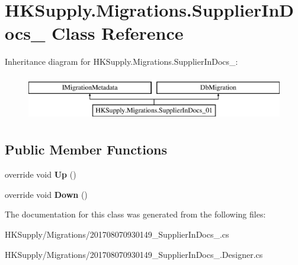 \hypertarget{class_h_k_supply_1_1_migrations_1_1_supplier_in_docs__01}{}\section{H\+K\+Supply.\+Migrations.\+Supplier\+In\+Docs\+\_ Class Reference}
\label{class_h_k_supply_1_1_migrations_1_1_supplier_in_docs__01}
Inheritance diagram for H\+K\+Supply.\+Migrations.\+Supplier\+In\+Docs\+\_\+:\begin{figure}[H]
\begin{center}
\leavevmode
\includegraphics[height=2.000000cm]{class_h_k_supply_1_1_migrations_1_1_supplier_in_docs__01}
\end{center}
\end{figure}
\subsection*{Public Member Functions}
\begin{DoxyCompactItemize}
\item 
\mbox{\label{class_h_k_supply_1_1_migrations_1_1_supplier_in_docs__01_a55641a6408ef08cee9d09b5052c2cf13}} 
override void {\bfseries Up} ()
\item 
\mbox{\label{class_h_k_supply_1_1_migrations_1_1_supplier_in_docs__01_a6d260361fa13d89337b1e90465776839}} 
override void {\bfseries Down} ()
\end{DoxyCompactItemize}


The documentation for this class was generated from the following files\+:\begin{DoxyCompactItemize}
\item 
H\+K\+Supply/\+Migrations/201708070930149\+\_\+\+Supplier\+In\+Docs\+\_.\+cs\item 
H\+K\+Supply/\+Migrations/201708070930149\+\_\+\+Supplier\+In\+Docs\+\_.\+Designer.\+cs\end{DoxyCompactItemize}
